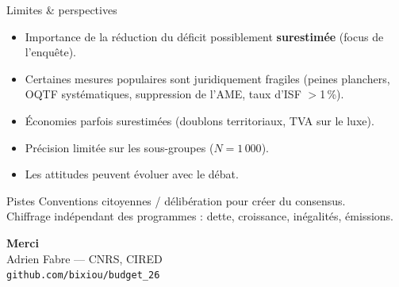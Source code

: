 \documentclass[11pt,aspectratio=169,french]{beamer}
\begin{document}
\begin{frame}{Limites \& perspectives}
  \begin{itemize}
    \item Importance de la réduction du déficit possiblement \textbf{surestimée} (focus de l'enquête).
    \item Certaines mesures populaires sont juridiquement fragiles (peines planchers,
          OQTF systématiques, suppression de l'AME, taux d'ISF $>$1\,\%).
    \item Économies parfois surestimées (doublons territoriaux, TVA sur le luxe).
    \item Précision limitée sur les sous-groupes ($N=1\,000$).
    \item Les attitudes peuvent évoluer avec le débat.
  \end{itemize}
  \vfill
  \begin{block}{Pistes}
    Conventions citoyennes / délibération pour créer du consensus.\\

    Chiffrage indépendant des programmes : dette, croissance, inégalités, émissions.
  \end{block}
\end{frame}

\begin{frame}[plain]
  \centering
  \vfill
  {\Large\color{accent}\textbf{Merci}}\\[1em]
  \normalsize Adrien Fabre — CNRS, CIRED\\[0.5em]
  \footnotesize\color{gray}\texttt{github.com/bixiou/budget\_26}
  \vfill
\end{frame}
\end{document}
